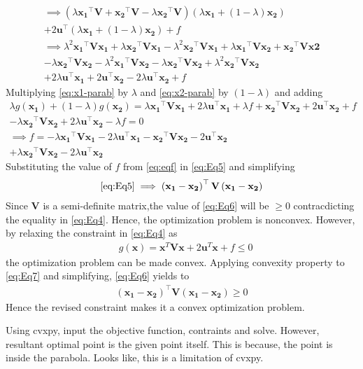 \documentclass[12pt]{article}
\providecommand{\brak}[1]{\ensuremath{\left(#1\right)}}
\let\vec\mathbf
\begin{document}
\begin{enumerate}
\begin{multline}
	\implies 
	\brak{\lambda\vec{x_1}^\top\vec{V}+\vec{x_2}^\top\vec{V}-\lambda\vec{x_2}^\top\vec{V}} \brak{\lambda\vec{x_1}+\brak{1-\lambda}\vec{x_2}} \\
	+ 2\vec{u}^\top\brak{\lambda\vec{x_1}+\brak{1-\lambda}\vec{x_2}} +f \\
	\implies 
	\lambda^2\vec{x_1}^\top\vec{V}\vec{x_1}+\lambda\vec{x_2}^\top\vec{V}\vec{x_1}-\lambda^2\vec{x_2}^\top\vec{V}\vec{x_1}+ \lambda\vec{x_1}^\top\vec{V}\vec{x_2}+\vec{x_2}^\top\vec{V}\vec{x2} \\
	-\lambda\vec{x_2}^\top\vec{V}\vec{x_2}-\lambda^2\vec{x_1}^\top\vec{V}\vec{x_2}-\lambda\vec{x_2}^\top\vec{V}\vec{x_2}+\lambda^2\vec{x_2}^\top\vec{V}\vec{x_2} \\
	+ 2\lambda\vec{u}^\top\vec{x_1}+2\vec{u}^\top\vec{x_2}-2\lambda\vec{u}^\top\vec{x_2} +f 
\end{multline}
		Multiplying \eqref{eq:x1-parab} by $\lambda$ and \eqref{eq:x2-parab} by $\brak{1-\lambda}$ and adding
\begin{multline}
	\label{eq:eqf}
	\lambda g\brak{\vec{x_1}}+ \brak{1-\lambda}g\brak{\vec{x_2}} = \lambda\vec{x_1}^\top\vec{Vx_1} + 2\lambda\vec{u}^\top\vec{x_1} + \lambda f + \vec{x_2}^\top\vec{V}\vec{x_2}+2\vec{u}^\top\vec{x_2}+f\\ 
	-\lambda\vec{x_2}^\top\vec{V}\vec{x_2}+2\lambda\vec{u}^\top\vec{x_2}-\lambda f = 0 \\
	\implies f = 
	-\lambda\vec{x_1}^\top\vec{Vx_1} - 2\lambda\vec{u}^\top\vec{x_1} -\vec{x_2}^\top\vec{V}\vec{x_2}-2\vec{u}^\top\vec{x_2}\\ 
	+\lambda\vec{x_2}^\top\vec{V}\vec{x_2}-2\lambda\vec{u}^\top\vec{x_2}
\end{multline}
Substituting the value of $f$ from \eqref{eq:eqf} in \eqref{eq:Eq5} and simplifying
\begin{align}
	\label{eq:Eq6}
	\eqref{eq:Eq5} \implies \brak{\vec{x_1}-\vec{x_2}}^\top\vec{V}\brak{\vec{x_1}-\vec{x_2}} 
\end{align}
Since $\vec{V}$ is a semi-definite matrix,the value of \eqref{eq:Eq6} will be $\ge 0$ contracdicting the equality in \eqref{eq:Eq4}. 
Hence, the optimization problem is nonconvex. However, by relaxing the constraint in \eqref{eq:Eq4} as
\begin{align}
	\label{eq:Eq7}
	& g\brak{\vec{x}} = \vec{x}^T\vec{V}\vec{x} + 2\vec{u}^T\vec{x} + f \le 0  
\end{align}
the optimization problem can be made convex. Applying convexity property to \eqref{eq:Eq7} and simplifying, \eqref{eq:Eq6} yields to
\begin{align}
	\label{eq:Eq8}
	\brak{\vec{x_1}-\vec{x_2}}^\top\vec{V}\brak{\vec{x_1}-\vec{x_2}} \ge 0 
\end{align}
Hence the revised constraint makes it a convex optimization problem.

Using cvxpy, input the objective function, contraints and solve. However, resultant optimal point is the given point itself. This is because, the point is inside the parabola. Looks like, this is a limitation of cvxpy.
\end{enumerate}
\end{document}
